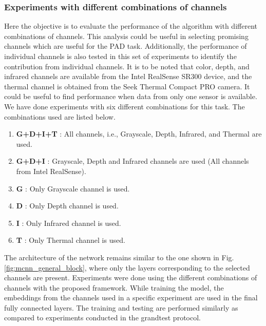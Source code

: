 \documentclass[journal]{IEEEtran}
\begin{document}
\subsubsection{Experiments with different combinations of channels}

Here the objective is to evaluate the performance of the algorithm with different combinations of channels.
This analysis could be useful in selecting promising channels which are useful for the PAD task.
Additionally, the performance of individual channels is also tested in this set of experiments to identify the contribution from individual channels. 
It is to be noted that color, depth, and infrared channels are available from the Intel RealSense SR300 device, and the thermal channel is obtained from the Seek Thermal Compact PRO camera. It could be useful to find performance when data from only one sensor is available. We have done experiments
with six different combinations for this task. The combinations used are listed below.
\begin{enumerate}
    \item \textbf{G+D+I+T} : All channels, i.e., Grayscale, Depth, Infrared, and Thermal are used.
    \item \textbf{G+D+I} :  Grayscale, Depth and  Infrared channels are used (All channels from Intel RealSense).
\item \textbf{G} : Only Grayscale channel is used.
    \item \textbf{D} : Only Depth channel is used.
    \item \textbf{I} : Only Infrared channel is used.
    \item \textbf{T} : Only Thermal channel is used.

\end{enumerate}


The architecture of the network remains similar to the one shown in Fig. \ref{fig:mcnn_general_block}, where only the layers corresponding to the selected channels are present.  Experiments were done using the different combinations of channels with the proposed framework. While training the model, the embeddings from the channels used in a specific experiment are used in the final fully connected layers. The training and testing are performed similarly as compared to experiments conducted in the grandtest protocol.
\end{document}
